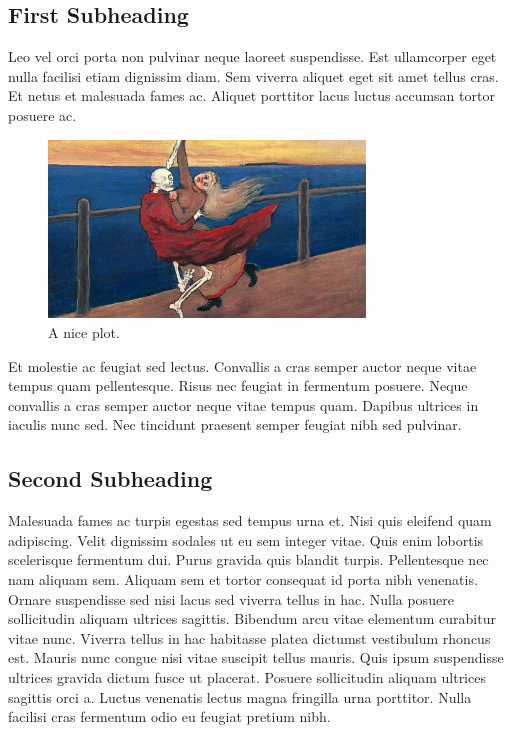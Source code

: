 \documentclass[a4paper]{article}
\begin{document}
\subsection{First Subheading}
Leo vel orci porta non pulvinar neque laoreet suspendisse. Est ullamcorper eget nulla facilisi etiam dignissim diam. Sem viverra aliquet eget sit amet tellus cras. Et netus et malesuada fames ac. Aliquet porttitor lacus luctus accumsan tortor posuere ac.

\begin{figure}[h]
	\centering
	\includegraphics[width=0.75\textwidth]{ref}
	\caption{A nice plot. \cite{ref.jpeg}}
	\label{fig:mesh1}
\end{figure}

Et molestie ac feugiat sed lectus. Convallis a cras semper auctor neque vitae tempus quam pellentesque. Risus nec feugiat in fermentum posuere. Neque convallis a cras semper auctor neque vitae tempus quam. Dapibus ultrices in iaculis nunc sed. Nec tincidunt praesent semper feugiat nibh sed pulvinar.

\subsection{Second Subheading}
Malesuada fames ac turpis egestas sed tempus urna et. Nisi quis eleifend quam adipiscing. Velit dignissim sodales ut eu sem integer vitae. Quis enim lobortis scelerisque fermentum dui. Purus gravida quis blandit turpis. Pellentesque nec nam aliquam sem. Aliquam sem et tortor consequat id porta nibh venenatis. Ornare suspendisse sed nisi lacus sed viverra tellus in hac. Nulla posuere sollicitudin aliquam ultrices sagittis. Bibendum arcu vitae elementum curabitur vitae nunc. Viverra tellus in hac habitasse platea dictumst vestibulum rhoncus est. Mauris nunc congue nisi vitae suscipit tellus mauris. Quis ipsum suspendisse ultrices gravida dictum fusce ut placerat. Posuere sollicitudin aliquam ultrices sagittis orci a. Luctus venenatis lectus magna fringilla urna porttitor. Nulla facilisi cras fermentum odio eu feugiat pretium nibh.
\end{document}
